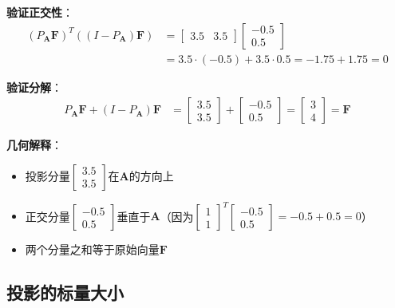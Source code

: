 \documentclass[12pt,a4paper]{article}
\begin{document}
\textbf{验证正交性}：
\begin{align}
(P_{\bm{A}} \bm{F})^T ((I - P_{\bm{A}}) \bm{F}) &= \begin{bmatrix} 3.5 & 3.5 \end{bmatrix} \begin{bmatrix} -0.5 \\ 0.5 \end{bmatrix} \\
&= 3.5 \cdot (-0.5) + 3.5 \cdot 0.5 = -1.75 + 1.75 = 0
\end{align}

\textbf{验证分解}：
\begin{align}
P_{\bm{A}} \bm{F} + (I - P_{\bm{A}}) \bm{F} &= \begin{bmatrix} 3.5 \\ 3.5 \end{bmatrix} + \begin{bmatrix} -0.5 \\ 0.5 \end{bmatrix} = \begin{bmatrix} 3 \\ 4 \end{bmatrix} = \bm{F}
\end{align}

\textbf{几何解释}：
\begin{itemize}
\item 投影分量$\begin{bmatrix} 3.5 \\ 3.5 \end{bmatrix}$在$\bm{A}$的方向上
\item 正交分量$\begin{bmatrix} -0.5 \\ 0.5 \end{bmatrix}$垂直于$\bm{A}$（因为$\begin{bmatrix} 1 \\ 1 \end{bmatrix}^T \begin{bmatrix} -0.5 \\ 0.5 \end{bmatrix} = -0.5 + 0.5 = 0$）
\item 两个分量之和等于原始向量$\bm{F}$
\end{itemize}

\subsection{投影的标量大小}
\end{document}
